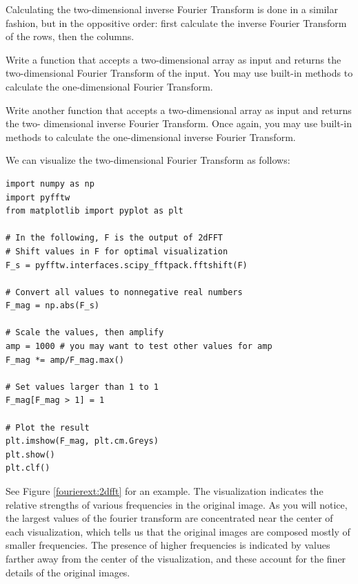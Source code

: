 Calculating the two-dimensional inverse Fourier Transform is done in a similar fashion, but in the
oppositive order: first calculate the inverse Fourier Transform of the rows, then the columns.

\begin{problem}
Write a function  that accepts a two-dimensional array as input and returns the two-dimensional
Fourier Transform of the input. You may use built-in methods to calculate the one-dimensional Fourier
Transform.

Write another function  that accepts a two-dimensional array as input and returns the two-
dimensional inverse Fourier Transform. Once again,  you may use built-in methods to calculate the
one-dimensional inverse Fourier Transform.
\end{problem}

We can visualize the two-dimensional Fourier Transform as follows:
\begin{lstlisting}
import numpy as np
import pyfftw
from matplotlib import pyplot as plt

# In the following, F is the output of 2dFFT
# Shift values in F for optimal visualization
F_s = pyfftw.interfaces.scipy_fftpack.fftshift(F)

# Convert all values to nonnegative real numbers
F_mag = np.abs(F_s)

# Scale the values, then amplify
amp = 1000 # you may want to test other values for amp
F_mag *= amp/F_mag.max()

# Set values larger than 1 to 1
F_mag[F_mag > 1] = 1

# Plot the result
plt.imshow(F_mag, plt.cm.Greys)
plt.show()
plt.clf()
\end{lstlisting}
See Figure \ref{fourierext:2dfft} for an example. The visualization indicates 
the relative strengths of various frequencies in the original image. 
As you will notice, the largest values of the fourier transform are concentrated 
near the center of each visualization, which tells us that the original images are 
composed mostly of smaller frequencies. The presence of higher frequencies is indicated
by values farther away from the center of the visualization, and these account for the
finer details of the original images.

